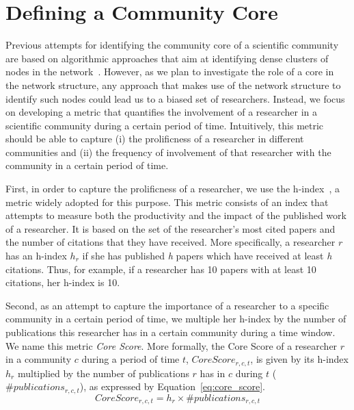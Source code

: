 \section{Defining a Community Core}

Previous attempts for identifying the community core of a scientific community are based on algorithmic approaches that aim at identifying dense clusters of nodes in the
network~\cite{Seifi:2012:CCE:2187980.2188258}.  However, as we plan to investigate the role of a core in the network structure, any approach that makes use of the network structure
to identify such nodes could lead us to a biased set of researchers. Instead, we focus on developing a metric that quantifies the involvement of a researcher in a scientific community
during a certain period of time.  Intuitively, this metric should be able to capture (i) the prolificness of a researcher in different communities and (ii) the frequency of involvement
of that researcher with the community in a certain period of time.

First, in order to capture the prolificness of a researcher, we use the h-index~\cite{Hirsch:2005}, a metric widely adopted for this purpose. This metric consists of an index that
attempts to measure both the productivity and the impact of the published work of a researcher. It is based on the set of the researcher's most cited papers and the number of
citations that they have received.  More specifically, a researcher $r$ has an h-index $h_r$ if she has published \textit{h} papers which have received at least \textit{h} citations. Thus, for
example, if a researcher has 10 papers with at least 10 citations, her h-index is 10.  

Second, as an attempt to capture the importance of a researcher to a specific community in a certain period of time, we multiple her h-index by the number of publications this
researcher has in a certain community during a time window. We name this metric \textit{Core Score}. More formally, the Core Score of a researcher $r$ in a community $c$ during a period of
time $t$, $Core{ }Score_{r,c,t}$, is given by its h-index $h_r$ multiplied by the number of publications $r$ has in $c$ during $t$ ($\textrm{\#}publications_{r,c,t}$),
as expressed by Equation~\ref{eq:core_score}. 
\vspace{-0.01cm}
\begin{equation} 
  \label{eq:core_score}
  Core{ }Score_{r,c,t} = h_r \times \textrm{\#}publications_{r,c,t}
\end{equation}

